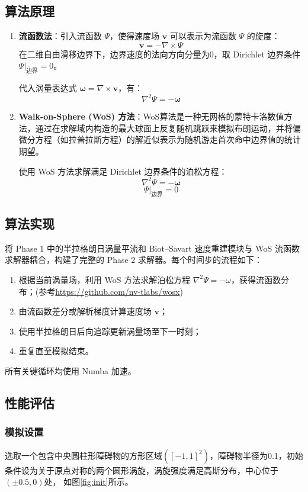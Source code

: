 \documentclass[UTF8,fontset=fandol]{ctexart}
\begin{document}
\subsection{算法原理}

\begin{enumerate}
    \item \textbf{流函数法}：引入流函数 $\Psi$，使得速度场 $\mathbf{v}$ 可以表示为流函数 $\Psi$ 的旋度：
\[\mathbf{v} = -\nabla \times \Psi\]
在二维自由滑移边界下，边界速度的法向方向分量为0，取 Dirichlet 边界条件 $\Psi|_{\text{边界}}=0$。

代入涡量表达式 $\boldsymbol{\omega} = \nabla \times \mathbf{v}$，有：
\[\nabla^2 \Psi = -\boldsymbol{\omega}\]

    \item \textbf{Walk-on-Sphere (WoS) 方法}：WoS算法是一种无网格的蒙特卡洛数值方法，通过在求解域内构造的最大球面上反复随机跳跃来模拟布朗运动，并将偏微分方程（如拉普拉斯方程）的解近似表示为随机游走首次命中边界值的统计期望。
    
    使用 WoS 方法求解满足 Dirichlet 边界条件的泊松方程：
    \[\nabla^2 \Psi = -\boldsymbol{\omega}\]
    \[\Psi|_{\text{边界}} = 0\]
\end{enumerate}

\subsection{算法实现}
将 Phase 1 中的半拉格朗日涡量平流和 Biot–Savart 速度重建模块与 WoS 流函数求解器耦合，构建了完整的 Phase 2 求解器。每个时间步的流程如下：
\begin{enumerate}
    \item 根据当前涡量场，利用 WoS 方法求解泊松方程 $\nabla^2 \Psi = -\omega$，获得流函数分布；(参考\url{https://github.com/nv-tlabs/wosx})
    \item 由流函数差分或解析梯度计算速度场 $\mathbf{v}$；
    \item 使用半拉格朗日后向追踪更新涡量场至下一时刻；
    \item 重复直至模拟结束。
\end{enumerate}

所有关键循环均使用 Numba 加速。

\subsection{性能评估}
\subsubsection{模拟设置}
选取一个包含中央圆柱形障碍物的方形区域$([-1 , 1]^2)$，障碍物半径为0.1，初始条件设为关于原点对称的两个圆形涡旋，涡旋强度满足高斯分布，中心位于$(\pm 0.5, 0)$处，
如图\ref{fig:init}所示。
\end{document}
